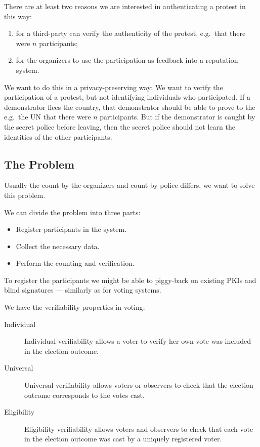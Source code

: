 There are at least two reasons we are interested in authenticating a protest in 
this way:
\begin{enumerate}
  \item for a third-party can verify the authenticity of the protest, e.g.\ 
    that there were \(n\) participants;
  \item for the organizers to use the participation as feedback into 
    a reputation system.
\end{enumerate}
We want to do this in a privacy-preserving way:
We want to verify the participation of a protest, but not identifying 
individuals who participated.
If a demonstrator flees the country, that demonstrator should be able to prove 
to the e.g.\ the UN that there were \(n\) participants.
But if the demonstrator is caught by the secret police before leaving, then the 
secret police should not learn the identities of the other participants.

\subsection{The Problem}

Usually the count by the organizers and count by police differs, we want to 
solve this problem.

We can divide the problem into three parts:
\begin{itemize}
  \item Register participants in the system.
  \item Collect the necessary data.
  \item Perform the counting and verification.
\end{itemize}

To register the participants we might be able to piggy-back on existing 
\acp{PKI} and blind signatures --- similarly as for voting systems.

We have the verifiability properties in voting:
\begin{description}
  \item[Individual] Individual verifiability allows a voter to verify her own 
    vote was included in the election outcome.
  \item[Universal] Universal verifiability allows voters or observers to check 
    that the election outcome corresponds to the votes cast.
  \item[Eligibility] Eligibility verifiability allows voters and observers to 
    check that each vote in the election outcome was cast by a uniquely 
    registered voter.
\end{description}

